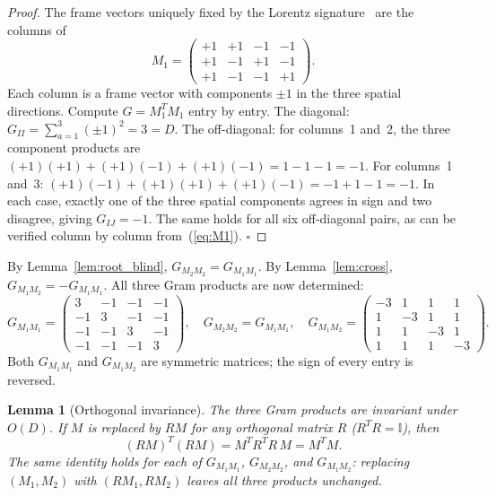 \documentclass[twocolumn]{iopjournal}
\newtheorem{lemma}{Lemma}
\theoremstyle{definition}
\begin{document}
\begin{proof}
The frame vectors uniquely fixed by the Lorentz
signature~\cite{Nelson2026a} are the columns of
\begin{equation}
  M_1 = \begin{pmatrix}
    +1 & +1 & -1 & -1 \\
    +1 & -1 & +1 & -1 \\
    +1 & -1 & -1 & +1
  \end{pmatrix}.
  \label{eq:M1}
\end{equation}
Each column is a frame vector with components $\pm 1$ in the three
spatial directions.  Compute $G = M_1^T M_1$ entry by entry.
The diagonal: $G_{II} = \sum_{a=1}^{3}(\pm 1)^2 = 3 = D$.  The
off-diagonal: for columns~1 and~2, the three component products are
$(+1)(+1) + (+1)(-1) + (+1)(-1) = 1 - 1 - 1 = -1$.  For columns~1
and~3: $(+1)(-1) + (+1)(+1) + (+1)(-1) = -1 + 1 - 1 = -1$.  In each
case, exactly one of the three spatial components agrees in sign and two
disagree, giving $G_{IJ} = -1$.  The same holds for all six off-diagonal
pairs, as can be verified column by column from~(\ref{eq:M1}).
\hfill$\square$
\end{proof}

\noindent
By Lemma~\ref{lem:root_blind}, $G_{M_2 M_2} = G_{M_1 M_1}$.  By
Lemma~\ref{lem:cross}, $G_{M_1 M_2} = -G_{M_1 M_1}$.  All three Gram
products are now determined:
\begin{equation}
  G_{M_1 M_1} = \begin{pmatrix}
    3 & -1 & -1 & -1 \\
    -1 & 3 & -1 & -1 \\
    -1 & -1 & 3 & -1 \\
    -1 & -1 & -1 & 3
  \end{pmatrix},\quad
  G_{M_2 M_2} = G_{M_1 M_1},\quad
  G_{M_1 M_2} = \begin{pmatrix}
    -3 & 1 & 1 & 1 \\
    1 & -3 & 1 & 1 \\
    1 & 1 & -3 & 1 \\
    1 & 1 & 1 & -3
  \end{pmatrix}.
  \label{eq:three_grams_explicit}
\end{equation}
Both $G_{M_1 M_1}$ and $G_{M_1 M_2}$ are symmetric matrices; the sign
of every entry is reversed.

\begin{lemma}[Orthogonal invariance]
\label{lem:orthogonal}
The three Gram products are invariant under $O(D)$.  If $M$ is replaced
by $RM$ for any orthogonal matrix $R$ ($R^T R = \mathbb{I}$), then
\begin{equation}
  (RM)^T(RM) = M^T R^T R\,M = M^T M.
  \label{eq:orthogonal_inv}
\end{equation}
The same identity holds for each of $G_{M_1 M_1}$, $G_{M_2 M_2}$, and
$G_{M_1 M_2}$: replacing $(M_1, M_2)$ with $(RM_1, RM_2)$ leaves all
three products unchanged.
\end{lemma}
\end{document}
